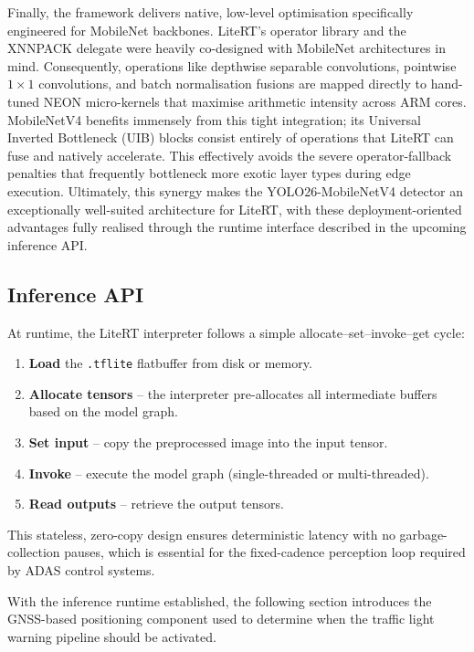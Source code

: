 Finally, the framework delivers native, low-level optimisation specifically engineered for MobileNet backbones. LiteRT's operator library and the XNNPACK delegate were heavily co-designed with MobileNet architectures in mind. Consequently, operations like depthwise separable convolutions, pointwise $1 \times 1$ convolutions, and batch normalisation fusions are mapped directly to hand-tuned NEON micro-kernels that maximise arithmetic intensity across ARM cores. MobileNetV4 benefits immensely from this tight integration; its Universal Inverted Bottleneck (UIB) blocks consist entirely of operations that LiteRT can fuse and natively accelerate. This effectively avoids the severe operator-fallback penalties that frequently bottleneck more exotic layer types during edge execution. Ultimately, this synergy makes the YOLO26-MobileNetV4 detector an exceptionally well-suited architecture for LiteRT, with these deployment-oriented advantages fully realised through the runtime interface described in the upcoming inference API.

\subsection{Inference API}

At runtime, the LiteRT interpreter follows a simple allocate--set--invoke--get cycle:

\begin{enumerate}
  \item \textbf{Load} the \texttt{.tflite} flatbuffer from disk or memory.
  \item \textbf{Allocate tensors} -- the interpreter pre-allocates all intermediate buffers based on the model graph.
  \item \textbf{Set input} -- copy the preprocessed image into the input tensor.
  \item \textbf{Invoke} -- execute the model graph (single-threaded or multi-threaded).
  \item \textbf{Read outputs} -- retrieve the output tensors.
\end{enumerate}

This stateless, zero-copy design ensures deterministic latency with no garbage-collection pauses, which is essential for the fixed-cadence perception loop required by ADAS control systems.

With the inference runtime established, the following section introduces the GNSS-based positioning component used to determine when the traffic light warning pipeline should be activated.